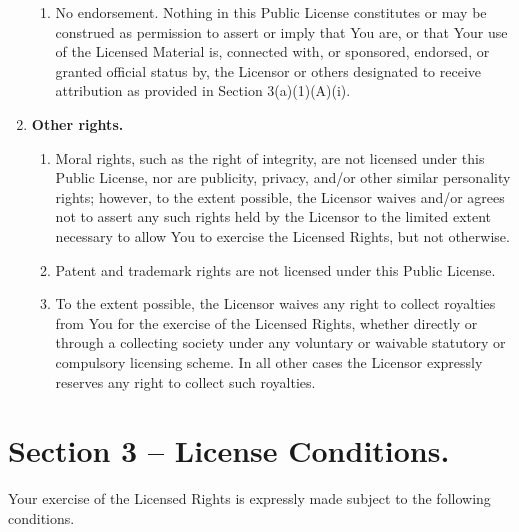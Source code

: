 \begin{enumerate}[label=\alph*.]
\begin{enumerate}[label=\arabic*.]
      \item   No endorsement. Nothing in this Public License constitutes or may be construed as permission to assert or imply that You are, or that Your use of the Licensed Material is, connected with, or sponsored, endorsed, or granted official status by, the Licensor or others designated to receive attribution as provided in Section 3(a)(1)(A)(i).
    \end{enumerate}

  \item \textbf{Other rights.}

    \begin{enumerate}[label=\arabic*.]
      \item Moral rights, such as the right of integrity, are not licensed under this Public License, nor are publicity, privacy, and/or other similar personality rights; however, to the extent possible, the Licensor waives and/or agrees not to assert any such rights held by the Licensor to the limited extent necessary to allow You to exercise the Licensed Rights, but not otherwise.

      \item Patent and trademark rights are not licensed under this Public License.

      \item To the extent possible, the Licensor waives any right to collect royalties from You for the exercise of the Licensed Rights, whether directly or through a collecting society under any voluntary or waivable statutory or compulsory licensing scheme. In all other cases the Licensor expressly reserves any right to collect such royalties.

    \end{enumerate}
\end{enumerate}


\section{Section 3 – License Conditions.}
\label{section3}

Your exercise of the Licensed Rights is expressly made subject to the following conditions.

